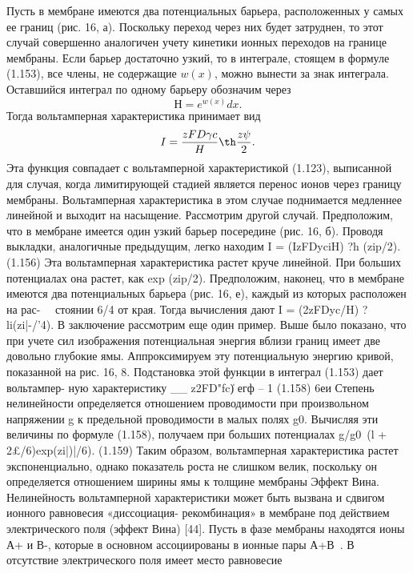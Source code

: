 Пусть в мембране имеются два потенциальных барьера, расположенных у самых ее
границ (рис. 16, а). Поскольку переход через них будет затруднен, то этот случай
совершенно аналогичен учету кинетики ионных переходов на границе мембраны.
Если барьер достаточно узкий, то в интеграле, стоящем в формуле (1.153), все
члены, не содержащие \( w(x) \), можно вынести за знак интеграла. Оставшийся
интеграл по одному барьеру обозначим через
\begin{equation}
    Н = e^{w(x)} dx.
\end{equation}
Тогда вольтамперная характеристика принимает вид
\begin{equation}
    I = \frac{zFD\gamma c}{H}\th\frac{z\psi}{2}.
\end{equation}
Эта функция совпадает с вольтамперной характеристикой (1.123), выписанной для случая, когда лимитирующей стадией является перенос ионов через границу мембраны. Вольтамперная характеристика в этом случае поднимается медленнее линейной и выходит на насыщение.
Рассмотрим другой случай. Предположим, что в мембране имеется один узкий барьер посередине (рис. 16, б). Проводя выкладки, аналогичные предыдущим, легко находим
I = (IzFDyciH) ?h (zip/2). (1.156)
Эта вольтамперная характеристика растет круче линейной. При больших потенциалах она растет, как exp (zip/2).
Предположим, наконец, что в мембране имеются два потенциальных барьера (рис. 16, е), каждый из которых расположен на рас- 
стоянии 6/4 от края. Тогда вычисления дают I = (2zFDyc/H) ?li(zi|-/'4).
В заключение рассмотрим еще один пример. Выше было показано, что при учете сил изображения потенциальная энергия вблизи границ имеет две довольно глубокие ямы. Аппроксимируем эту потенциальную энергию кривой, показанной на рис. 16, 8. Подстановка этой функции в интеграл (1.153) дает вольтампер- ную характеристику
__ z2FD"fc\|) егф -- 1
(1.158)
6еи
Степень нелинейности определяется отношением проводимости при произвольном напряжении g к предельной проводимости в малых полях g0. Вычисляя эти величины по формуле (1.158), получаем при больших потенциалах
g/g0~(l + 2£/6)exp(zi|)|/6). (1.159)
Таким образом, вольтамперная характеристика растет экспоненциально, однако показатель роста не слишком велик, поскольку он определяется отношением ширины ямы к толщине мембраны %
Эффект Вина. Нелинейность вольтамперной характеристики может быть вызвана и сдвигом ионного равновесия «диссоциация- рекомбинация» в мембране под действием электрического поля (эффект Вина) [44].
Пусть в фазе мембраны находятся ионы А+ и В-, которые в основном ассоциированы в ионные пары А+В~. В отсутствие электрического поля имеет место равновесие

